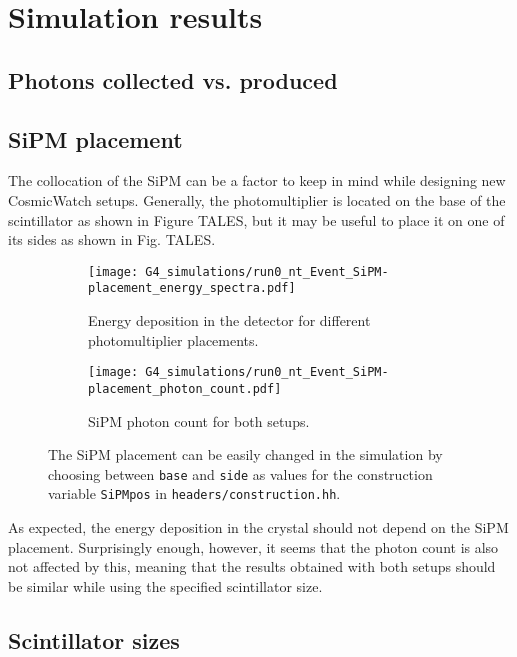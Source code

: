 \section{Simulation results}

\subsection{Photons collected vs. produced}\label{sec:collected_produced}

\subsection{SiPM placement}\label{sec:SiPM_placement}

The collocation of the SiPM can be a factor to keep in mind while designing new CosmicWatch setups. Generally, the photomultiplier is located on the base of the scintillator as shown in Figure TALES, but it may be useful to place it on one of its sides as shown in Fig. TALES.

\begin{figure}[H]
    \centering
    \begin{subfigure}[t]{0.48\textwidth}
      \texttt{[image: G4\_simulations/run0\_nt\_Event\_SiPM-placement\_energy\_spectra.pdf]}
      \caption{\label{sfig:SiPM_place_edep}Energy deposition in the detector for different photomultiplier placements.}
    \end{subfigure}
    \hfill
    \begin{subfigure}[t]{0.48\textwidth}
      \texttt{[image: G4\_simulations/run0\_nt\_Event\_SiPM-placement\_photon\_count.pdf]}
      \caption{\label{sfig:SiPM_place_pcount}SiPM photon count for both setups.}
    \end{subfigure}
    \caption{\label{fig:SiPM_place_results}The SiPM placement can be easily changed in the simulation by choosing between \texttt{base} and \texttt{side} as values for the construction variable \texttt{SiPMpos} in \texttt{headers/construction.hh}.}
\end{figure}

As expected, the energy deposition in the crystal should not depend on the SiPM placement. Surprisingly enough, however, it seems that the photon count is also not affected by this, meaning that the results obtained with both setups should be similar while using the specified scintillator size.

\subsection{Scintillator sizes}\label{sec:Scint_size}

